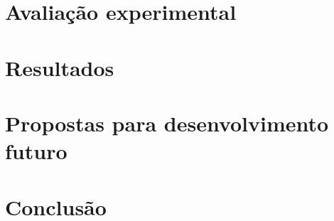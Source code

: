 \documentclass[
	12pt,				%
	openright,			%
	oneside,
	a4paper,			%
	english,			%
	french,				%
	spanish,			%
	brazil				%
	]{abntex2}
\begin{document}
\chapter{Avaliação experimental}
\chapter{Resultados}
\chapter{Propostas para desenvolvimento futuro}


\chapter{Conclusão}

\postextual



%
%




\end{document}

